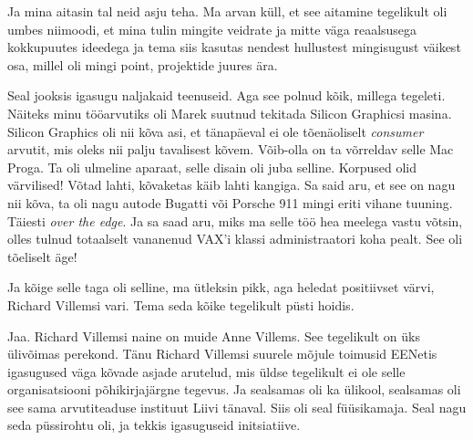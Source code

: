 
Ja mina aitasin tal neid asju teha. Ma arvan küll, et see aitamine tegelikult 
oli  umbes niimoodi, et mina tulin mingite veidrate ja mitte väga reaalsusega 
kokkupuutes ideedega ja tema siis  kasutas nendest hullustest 
mingisugust väikest osa, millel oli mingi point, projektide juures ära.


Seal jooksis igasugu naljakaid teenuseid. Aga see polnud kõik, millega tegeleti. 
Näiteks minu tööarvutiks oli Marek suutnud tekitada  Silicon 
Graphicsi masina. Silicon Graphics oli nii kõva asi, et tänapäeval 
ei ole tõenäoliselt \emph{consumer} arvutit, mis oleks nii palju tavalisest 
kõvem. Võib-olla on ta võrreldav selle Mac Proga. Ta oli ulmeline aparaat, 
selle disain oli juba selline. Korpused olid värvilised! Võtad lahti, kõvaketas 
käib lahti kangiga. Sa said aru, et see on nagu nii kõva, ta oli nagu autode 
Bugatti või Porsche 911  mingi eriti vihane tuuning. Täiesti \emph{over the 
edge}. Ja sa saad aru, miks ma selle töö hea meelega vastu võtsin, olles tulnud  
totaalselt vananenud VAX'i klassi administraatori koha pealt. See oli tõeliselt 
äge!

Ja kõige selle taga oli selline, ma ütleksin  pikk, aga  heledat positiivset 
värvi, Richard Villemsi vari. Tema seda kõike 
tegelikult püsti hoidis.


Jaa. Richard Villemsi naine on muide Anne Villems. 
See tegelikult on  üks ülivõimas perekond. Tänu Richard Villemsi suurele 
mõjule toimusid EENetis igasugused väga kõvade asjade arutelud, 
mis üldse tegelikult ei ole selle organisatsiooni põhikirjajärgne tegevus. Ja 
sealsamas oli ka ülikool,  sealsamas oli see sama arvutiteaduse 
instituut  
Liivi tänaval. Siis oli seal füüsikamaja. Seal nagu seda püssirohtu oli, ja 
tekkis  igasuguseid initsiatiive.

